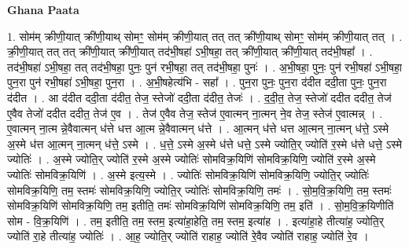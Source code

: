\documentclass[17pt]{extarticle}
\begin{document}
\textbf{Ghana Paata } \newline

1. सोम॑म् क्रीणी॒यात् क्री॑णी॒याथ् सोमꣳ॒॒ सोम॑म् क्रीणी॒यात् तत् तत् क्री॑णी॒याथ् सोमꣳ॒॒ सोम॑म् क्रीणी॒यात् तत् । . क्री॒णी॒यात् तत् तत् क्री॑णी॒यात् क्री॑णी॒यात् तद॑भी॒षहा॑ ऽभी॒षहा॒ तत् क्री॑णी॒यात् क्री॑णी॒यात् तद॑भी॒षहा᳚ । . तद॑भी॒षहा॑ ऽभी॒षहा॒ तत् तद॑भी॒षहा॒ पुनः॒ पुन॑ रभी॒षहा॒ तत् तद॑भी॒षहा॒ पुनः॑ । . अ॒भी॒षहा॒ पुनः॒ पुन॑ रभी॒षहा॑ ऽभी॒षहा॒ पुन॒रा पुन॑ रभी॒षहा॑ ऽभी॒षहा॒ पुन॒रा । . अ॒भी॒षहेत्य॑भि - सहा᳚ । . पुन॒रा पुनः॒ पुन॒रा द॑दीत ददी॒ता पुनः॒ पुन॒रा द॑दीत । . आ द॑दीत ददी॒ता द॑दीत॒ तेज॒ स्तेजो॑ ददी॒ता द॑दीत॒ तेजः॑ । . द॒दी॒त॒ तेज॒ स्तेजो॑ ददीत ददीत॒ तेज॑ ए॒वैव तेजो॑ ददीत ददीत॒ तेज॑ ए॒व । . तेज॑ ए॒वैव तेज॒ स्तेज॑ ए॒वात्मन् ना॒त्मन् ने॒व तेज॒ स्तेज॑ ए॒वात्मन्न् । . ए॒वात्मन् ना॒त्म न्ने॒वैवात्मन् ध॑त्ते धत्त आ॒त्म न्ने॒वैवात्मन् ध॑त्ते । . आ॒त्मन् ध॑त्ते धत्त आ॒त्मन् ना॒त्मन् ध॑त्ते॒ ऽस्मे अ॒स्मे ध॑त्त आ॒त्मन् ना॒त्मन् ध॑त्ते॒ ऽस्मे । . ध॒त्ते॒ ऽस्मे अ॒स्मे ध॑त्ते धत्ते॒ ऽस्मे ज्योति॒र् ज्योति॑ र॒स्मे ध॑त्ते धत्ते॒ ऽस्मे ज्योतिः॑ । . अ॒स्मे ज्योति॒र् ज्योति॑ र॒स्मे अ॒स्मे ज्योतिः॑ सोमविक्र॒यिणि॑ सोमविक्र॒यिणि॒ ज्योति॑ र॒स्मे अ॒स्मे ज्योतिः॑ सोमविक्र॒यिणि॑ । . अ॒स्मे इत्य॒स्मे । . ज्योतिः॑ सोमविक्र॒यिणि॑ सोमविक्र॒यिणि॒ ज्योति॒र् ज्योतिः॑ सोमविक्र॒यिणि॒ तम॒ स्तमः॑ सोमविक्र॒यिणि॒ ज्योति॒र् ज्योतिः॑ सोमविक्र॒यिणि॒ तमः॑ । . सो॒म॒वि॒क्र॒यिणि॒ तम॒ स्तमः॑ सोमविक्र॒यिणि॑ सोमविक्र॒यिणि॒ तम॒ इतीति॒ तमः॑ सोमविक्र॒यिणि॑ सोमविक्र॒यिणि॒ तम॒ इति॑ । . सो॒म॒वि॒क्र॒यिणीति॑ सोम - वि॒क्र॒यिणि॑ । . तम॒ इतीति॒ तम॒ स्तम॒ इत्या॑हा॒हेति॒ तम॒ स्तम॒ इत्या॑ह । . इत्या॑हा॒हे तीत्या॑ह॒ ज्योति॒र् ज्योति॑ रा॒हे तीत्या॑ह॒ ज्योतिः॑ । . आ॒ह॒ ज्योति॒र् ज्योति॑ राहाह॒ ज्योति॑ रे॒वैव ज्योति॑ राहाह॒ ज्योति॑ रे॒व । \newline
\end{document}
